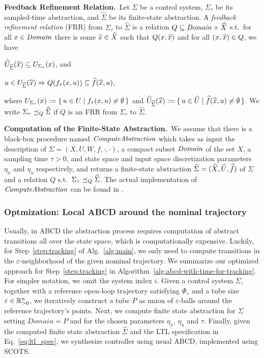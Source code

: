 \smallskip
\noindent\textbf{Feedback Refinement Relation.}\
Let $\Sigma$ be a control system, $\Sigma_\tau$ be its sampled-time abstraction, and $\widehat{\Sigma}$ be its finite-state abstraction.
A \emph{feedback refinement relation} (FRR) from $\Sigma_\tau$ to $\widehat{\Sigma}$ 
is a relation $Q\subseteq \mathit{Domain}\times \widehat{X}$ s.t.\ 
for all $x\in \mathit{Domain}$ there is some $\widehat{x}\in \widehat{X}$ such that $Q(x,\widehat{x})$ and
for all $(x,\widehat{x})\in Q$, we have
\begin{inparaenum}[(i)]
	\item $\widehat{U}_{\widehat{\Sigma}}(\widehat{x})\subseteq U_{\Sigma_\tau}(x)$, and 
	\item $u\in U_{\widehat{\Sigma}}(\widehat{x}) \Rightarrow Q(f_\tau(x,u))\subseteq \widehat{f}(\widehat{x},u)$,
\end{inparaenum}
where $U_{\Sigma_\tau}(x):=\set{u\in U \mid f_\tau(x,u)\neq \emptyset}$ and $\widehat{U}_{\widehat{\Sigma}}(\widehat{x}):=\set{u\in \widehat{U}\mid \widehat{f}(\widehat{x},u)\neq \emptyset}$.
We write $\Sigma_\tau \preceq_{Q} \widehat{\Sigma}$ if $Q$ is an FRR from $\Sigma_\tau$ to $\widehat{\Sigma}$.


\smallskip
\noindent\textbf{Computation of the Finite-State Abstraction.}\
We assume that there is a black-box procedure named $\mathit{ComputeAbstraction}$ which takes as input the description of $\Sigma = (X,U,W,f,\cdot,\cdot)$, a compact subset $\mathit{Domain}$ of the set $X$, a sampling time $\tau>0$, and state space and input space discretization parameters $\eta_x$ and $\eta_u$ respectively, and returns a finite-state abstraction $\widehat{\Sigma} = (\widehat{X},\widehat{U},\widehat{f})$ of $\Sigma$ and a relation $Q$ s.t.\ $\Sigma_\tau \preceq_{Q} \widehat{\Sigma}$.
The actual implementation of $\mathit{ComputeAbstraction}$ can be found in \cite{reissig2016feedback}.








\subsubsection{Optmization: Local ABCD around the nominal trajectory}\hfill

Usually, in ABCD the abstraction process requires computation of abstract transitions all over the state space, which is computationally expensive.
Luckily, for Step~\ref{step:tracking} of Alg.~\ref{alg:main}, we only need to compute transitions in the $\varepsilon$-neighborhood of the given nominal trajectory.
We summarize our optimized approach for Step~\ref{step:tracking} in Algorithm~\ref{alg:abcd-with-time-for-tracking}.
For simpler notation, we omit the system index $i$.
Given a control system $\Sigma$, together with a reference open-loop trajectory satisfying $\Phi_\varepsilon$ and a tube size $\varepsilon\in \mathbb{R}_{>0}^n$, we iteratively construct a tube $P$ as union of $\varepsilon$-balls around the reference trajectory's points. 
Next, we compute finite state abstraction for $\Sigma$ setting $Domain=P$ and for the chosen parameters $\eta_x$, $\eta_u$ and $\tau$. 
Finally, given the computed finite state abstraction $\widehat \Sigma$ and the LTL specification in Eq.~\eqref{eq:ltl_spec}, we synthesize controller using usual ABCD, implemented using SCOTS. %

